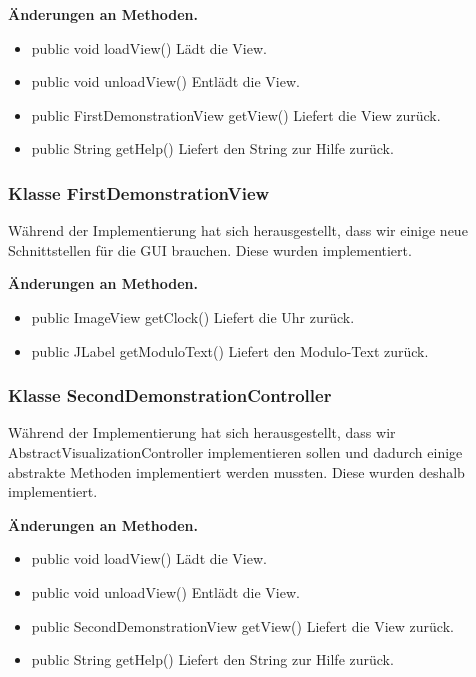 \documentclass{article}
\begin{document}
    \textbf{Änderungen an Methoden.}
      \begin{itemize}
		\item public void loadView()\newline
              Lädt die View.
        \item public void unloadView()\newline
              Entlädt die View.
        \item public FirstDemonstrationView getView()\newline
              Liefert die View zurück.
        \item public String getHelp()\newline
              Liefert den String zur Hilfe zurück.
      \end{itemize}
	  
    \subsubsection{Klasse FirstDemonstrationView}
	Während der Implementierung hat sich herausgestellt, dass wir einige neue Schnittstellen für die GUI brauchen. Diese wurden implementiert.\newline
           
    \textbf{Änderungen an Methoden.}
      \begin{itemize}
        \item public ImageView getClock()\newline
              Liefert die Uhr zurück.
        \item public JLabel getModuloText()\newline
              Liefert den Modulo-Text zurück.
      \end{itemize}

    \subsubsection{Klasse SecondDemonstrationController}
	Während der Implementierung hat sich herausgestellt, dass wir AbstractVisualizationController implementieren sollen und dadurch 
	einige abstrakte Methoden implementiert werden mussten. Diese wurden deshalb implementiert.\newline
           
    \textbf{Änderungen an Methoden.}
      \begin{itemize}
		\item public void loadView()\newline
              Lädt die View.
        \item public void unloadView()\newline
              Entlädt die View.
        \item public SecondDemonstrationView getView()\newline
              Liefert die View zurück.
        \item public String getHelp()\newline
              Liefert den String zur Hilfe zurück.
      \end{itemize}
\end{document}
